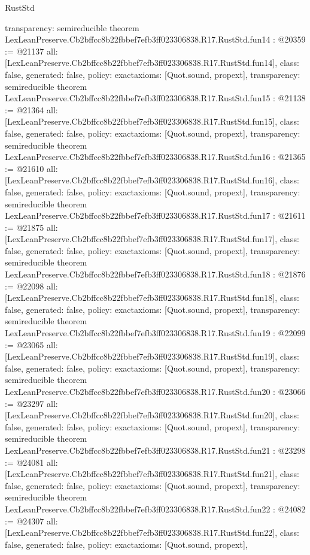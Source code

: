 \begin{lexlean}{RustStd}
\begin{coremodule}
{  transparency: semireducible
}
theorem LexLeanPreserve.Cb2bffcc8b22fbbef7efb3ff023306838.R17.RustStd.fun14 : @20359 := @21137 {
  all: [LexLeanPreserve.Cb2bffcc8b22fbbef7efb3ff023306838.R17.RustStd.fun14],
  class: false,
  generated: false,
  policy: exact{axioms: [Quot.sound, propext]},
  transparency: semireducible
}
theorem LexLeanPreserve.Cb2bffcc8b22fbbef7efb3ff023306838.R17.RustStd.fun15 : @21138 := @21364 {
  all: [LexLeanPreserve.Cb2bffcc8b22fbbef7efb3ff023306838.R17.RustStd.fun15],
  class: false,
  generated: false,
  policy: exact{axioms: [Quot.sound, propext]},
  transparency: semireducible
}
theorem LexLeanPreserve.Cb2bffcc8b22fbbef7efb3ff023306838.R17.RustStd.fun16 : @21365 := @21610 {
  all: [LexLeanPreserve.Cb2bffcc8b22fbbef7efb3ff023306838.R17.RustStd.fun16],
  class: false,
  generated: false,
  policy: exact{axioms: [Quot.sound, propext]},
  transparency: semireducible
}
theorem LexLeanPreserve.Cb2bffcc8b22fbbef7efb3ff023306838.R17.RustStd.fun17 : @21611 := @21875 {
  all: [LexLeanPreserve.Cb2bffcc8b22fbbef7efb3ff023306838.R17.RustStd.fun17],
  class: false,
  generated: false,
  policy: exact{axioms: [Quot.sound, propext]},
  transparency: semireducible
}
theorem LexLeanPreserve.Cb2bffcc8b22fbbef7efb3ff023306838.R17.RustStd.fun18 : @21876 := @22098 {
  all: [LexLeanPreserve.Cb2bffcc8b22fbbef7efb3ff023306838.R17.RustStd.fun18],
  class: false,
  generated: false,
  policy: exact{axioms: [Quot.sound, propext]},
  transparency: semireducible
}
theorem LexLeanPreserve.Cb2bffcc8b22fbbef7efb3ff023306838.R17.RustStd.fun19 : @22099 := @23065 {
  all: [LexLeanPreserve.Cb2bffcc8b22fbbef7efb3ff023306838.R17.RustStd.fun19],
  class: false,
  generated: false,
  policy: exact{axioms: [Quot.sound, propext]},
  transparency: semireducible
}
theorem LexLeanPreserve.Cb2bffcc8b22fbbef7efb3ff023306838.R17.RustStd.fun20 : @23066 := @23297 {
  all: [LexLeanPreserve.Cb2bffcc8b22fbbef7efb3ff023306838.R17.RustStd.fun20],
  class: false,
  generated: false,
  policy: exact{axioms: [Quot.sound, propext]},
  transparency: semireducible
}
theorem LexLeanPreserve.Cb2bffcc8b22fbbef7efb3ff023306838.R17.RustStd.fun21 : @23298 := @24081 {
  all: [LexLeanPreserve.Cb2bffcc8b22fbbef7efb3ff023306838.R17.RustStd.fun21],
  class: false,
  generated: false,
  policy: exact{axioms: [Quot.sound, propext]},
  transparency: semireducible
}
theorem LexLeanPreserve.Cb2bffcc8b22fbbef7efb3ff023306838.R17.RustStd.fun22 : @24082 := @24307 {
  all: [LexLeanPreserve.Cb2bffcc8b22fbbef7efb3ff023306838.R17.RustStd.fun22],
  class: false,
  generated: false,
  policy: exact{axioms: [Quot.sound, propext]},
}
\end{coremodule}
\end{lexlean}

